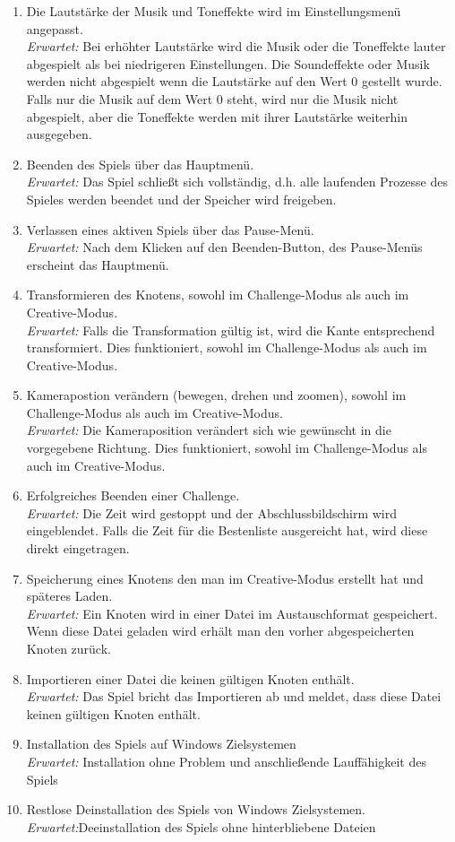 \begin{enumerate}
\item Die Lautstärke der Musik und Toneffekte wird im Einstellungsmenü angepasst. \\  
\textit{Erwartet:} Bei erhöhter Lautstärke wird die Musik oder die Toneffekte lauter abgespielt als bei niedrigeren Einstellungen. Die Soundeffekte oder Musik werden nicht abgespielt wenn die Lautstärke auf den Wert 0 gestellt wurde. Falls nur die Musik auf dem Wert 0 steht, wird nur die Musik nicht abgespielt, aber die Toneffekte werden mit ihrer Lautstärke weiterhin ausgegeben.
\item Beenden des Spiels über das Hauptmenü.\\
\textit{Erwartet:} Das Spiel schließt sich vollständig, d.h. alle laufenden Prozesse des Spieles werden beendet und der Speicher wird freigeben.
\item Verlassen eines aktiven Spiels über das Pause-Menü.\\
\textit{Erwartet:} Nach dem Klicken auf den Beenden-Button, des Pause-Menüs erscheint das Hauptmenü.
\item Transformieren des Knotens, sowohl im Challenge-Modus als auch im Creative-Modus.\\
\textit{Erwartet:} Falls die Transformation gültig ist, wird die Kante entsprechend transformiert. Dies funktioniert, sowohl im Challenge-Modus als auch im Creative-Modus.
\item Kamerapostion verändern (bewegen, drehen und zoomen), sowohl im Challenge-Modus als auch im Creative-Modus.\\
\textit{Erwartet:} Die Kameraposition verändert sich wie gewünscht in die vorgegebene Richtung. Dies funktioniert, sowohl im Challenge-Modus als auch im Creative-Modus.
\item Erfolgreiches Beenden einer Challenge. \\
\textit{Erwartet:} Die Zeit wird gestoppt und der Abschlussbildschirm wird eingeblendet. Falls die Zeit für die Bestenliste ausgereicht hat, wird diese direkt eingetragen.
\item Speicherung eines Knotens den man im Creative-Modus erstellt hat und späteres Laden.\\
\textit{Erwartet:} Ein Knoten wird in einer Datei im Austauschformat gespeichert. Wenn diese Datei geladen wird erhält man den vorher abgespeicherten Knoten zurück.
\item Importieren einer Datei die keinen gültigen Knoten enthält.\\
\textit{Erwartet:} Das Spiel bricht das Importieren ab und meldet, dass diese Datei keinen gültigen Knoten enthält.
\item Installation des Spiels auf Windows Zielsystemen\\
\textit{Erwartet:} Installation ohne Problem und anschließende Lauffähigkeit des Spiels
\item Restlose Deinstallation des Spiels von Windows Zielsystemen.\\
\textit{Erwartet:}Deeinstallation des Spiels ohne hinterbliebene Dateien

\end{enumerate}


